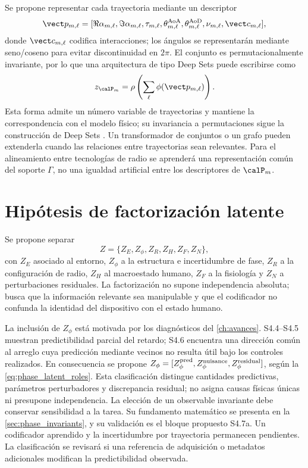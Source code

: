 Se propone representar cada trayectoria mediante un descriptor
\begin{equation}
\vect p_{m,\ell}=
[\Re\alpha_{m,\ell},\Im\alpha_{m,\ell},\tau_{m,\ell},
\theta^{\rm AoA}_{m,\ell},\theta^{\rm AoD}_{m,\ell},
\nu_{m,\ell},\vect c_{m,\ell}],
\end{equation}
donde $\vect c_{m,\ell}$ codifica interacciones; los ángulos se representarán mediante seno/coseno para evitar discontinuidad en $2\pi$. El conjunto es permutacionalmente invariante, por lo que una arquitectura de tipo Deep Sets puede escribirse como
\begin{equation}
z_{\calP_m}=\rho\left(\sum_{\ell}\phi(\vect p_{m,\ell})\right).
\label{eq:deepset_paths}
\end{equation}
Esta forma admite un número variable de trayectorias y mantiene la correspondencia con el modelo físico; su invariancia a permutaciones sigue la construcción de Deep Sets \citep{Zaheer2017DeepSets}. Un transformador de conjuntos o un grafo pueden extenderla cuando las relaciones entre trayectorias sean relevantes. Para el alineamiento entre tecnologías de radio se aprenderá una representación común del soporte $\Gamma$, no una igualdad artificial entre los descriptores de $\calP_m$.

\section{Hipótesis de factorización latente}

Se propone separar
\begin{equation}
Z=\{Z_E,Z_\phi,Z_R,Z_H,Z_F,Z_N\},
\label{eq:factor_latent}
\end{equation}
con $Z_E$ asociado al entorno, $Z_\phi$ a la estructura e incertidumbre de fase, $Z_R$ a la configuración de radio, $Z_H$ al macroestado humano, $Z_F$ a la fisiología y $Z_N$ a perturbaciones residuales. La factorización no supone independencia absoluta; busca que la información relevante sea manipulable y que el codificador no confunda la identidad del dispositivo con el estado humano.

La inclusión de $Z_\phi$ está motivada por los diagnósticos del
\cref{ch:avances}. S4.4--S4.5 muestran predictibilidad parcial del retardo;
S4.6 encuentra una dirección común al arreglo cuya predicción mediante vecinos
no resulta útil bajo los controles realizados. En consecuencia se propone
$Z_\phi=[Z_\phi^{\rm pred},Z_\phi^{\rm nuisance},Z_\phi^{\rm residual}]$,
según la \cref{eq:phase_latent_roles}. Esta clasificación distingue cantidades
predictivas, parámetros perturbadores y discrepancia residual; no asigna causas
físicas únicas ni presupone independencia. La elección de un observable
invariante debe conservar sensibilidad a la tarea. Su fundamento matemático
se presenta en la \cref{sec:phase_invariants}, y su validación es el bloque
propuesto S4.7a. Un codificador aprendido y la incertidumbre por trayectoria
permanecen pendientes. La clasificación se revisará si una referencia de
adquisición o metadatos adicionales modifican la predictibilidad observada.

